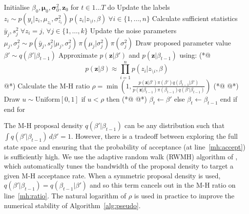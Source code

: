 \documentclass[nojss,shortnames]{jss}\usepackage[]{graphicx}\usepackage[]{color}
\begin{document}
\begin{algorithm}[float,caption={MCMC with pseudolikelihood (PL)}, label={alg:pseudo}]
Initialise $\beta_0, \boldsymbol\mu_0, \boldsymbol\sigma^2_0, \mathbf{z}_0$
for $t \in 1\dots T$ do
  Update the labels $z_i \sim p(y_i | z_i, \mu_{z_i}, \sigma^2_{z_i}) \,p(z_i | z_{\setminus i}, \beta) \; \forall i \in \{ 1, \dots, n\}$
  Calculate sufficient statistics $\bar{y}_j, s^2_j \; \forall z_i = j, \, \forall j \in \{ 1, \dots, k\}$
  Update the noise parameters $\mu_j, \sigma^2_j \sim p(\bar{y}_j, s^2_j | \mu_j, \sigma_j^2) \,\pi(\mu_j | \sigma^2_j) \, \pi(\sigma^2_j)$
  Draw proposed parameter value $\beta' \sim q(\beta' | \beta_{t-1})$
  Approximate $p(\mathbf{z}|\beta')$ and $p(\mathbf{z}|\beta_{t-1})$ using: (*@
 \begin{equation} \label{eq:pseudo}
p(\mathbf{z}|\beta) \approx \prod_{i=1}^n p(z_i | z_{\setminus i}, \beta)
\end{equation}  @*)
  Calculate the M-H ratio $\rho = \min\left( 1, \frac{p(\mathbf{z}|\beta') \pi(\beta') q(\beta_{t-1} | \beta')}{p(\mathbf{z}|\beta_{t-1}) \pi(\beta_{t-1}) q(\beta' | \beta_{t-1})} \right)$ (*@ \label{mh:ratio} @*)
  Draw $u \sim \mathrm{Uniform}[0,1]$
  if $u < \rho$ then (*@ \label{mh:accept} @*)
    $\beta_t \gets \beta'$ 
  else
    $\beta_t \gets \beta_{t-1}$ 
  end if
end for
\end{algorithm}

The M-H proposal density $q(\beta'|\beta_{t-1})$ can be any distribution such that $\int q(\beta'|\beta_{t-1})\, d\beta' = 1$. However, there is a tradeoff between exploring the full state space and ensuring that the probability of acceptance (at line~\ref{mh:accept}) is sufficiently high. We use the adaptive random walk (RWMH) algorithm of \citet{Garthwaite2010}, which automatically tunes the bandwidth of the proposal density to target a given M-H acceptance rate. When a symmetric proposal density is used, $q(\beta'|\beta_{t-1}) = q(\beta_{t-1}|\beta')$ and so this term cancels out in the M-H ratio on line~\ref{mh:ratio}. The natural logarithm of $\rho$ is used in practice to improve the numerical stability of Algorithm~\ref{alg:pseudo}. 
\end{document}
